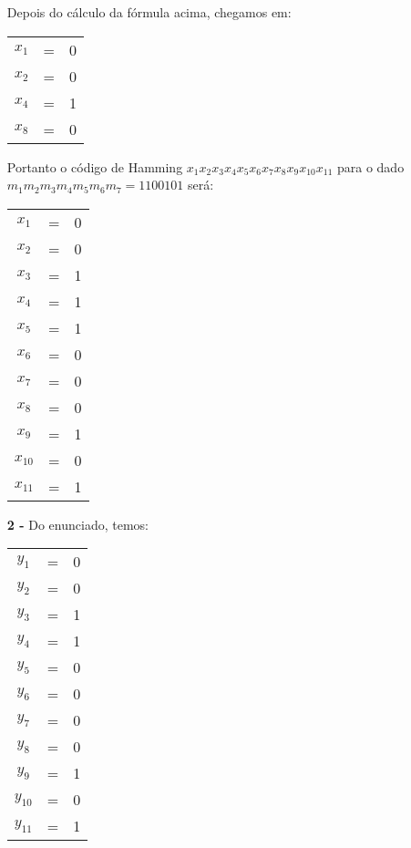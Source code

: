 \documentclass[12pt]{article}
\begin{document}
\begin{itemize}
			Depois do cálculo da fórmula acima, chegamos em:
			\begin{center}
				\begin{tabular}{ccl}
					$x_1$ & = & 0\\
					$x_2$ & = & 0\\
					$x_4$ & = & 1\\
					$x_8$ & = & 0\\
				\end{tabular}
			\end{center}
			Portanto o código de Hamming $x_1x_2x_3x_4x_5x_6x_7x_8x_9x_{10}x_{11}$ para 
			o dado $m_1m_2m_3m_4m_5m_6m_7 = 1100101$ será:
			\begin{center}
				\begin{tabular}{ccc}
					$x_1$ & = & 0\\
					$x_2$ & = & 0\\
					$x_3$ & = & 1 \\
					$x_4$ & = & 1\\
					$x_5$ & = & 1\\
					$x_6$ & = & 0\\
					$x_7$ & = & 0\\
					$x_8$ & = & 0\\
					$x_9$ & = & 1\\
					$x_{10}$ & = & 0\\
					$x_{11}$ & = & 1\\
				\end{tabular}
			\end{center}
		\newpage
		\item[\textbf{2 -}]
			\hfill\newline
			Do enunciado, temos:
			\begin{center}
				\begin{tabular}{ccc}
					$y_1$ & = & 0\\
					$y_2$ & = & 0\\
					$y_3$ & = & 1\\
					$y_4$ & = & 1\\
					$y_5$ & = & 0\\
					$y_6$ & = & 0\\
					$y_7$ & = & 0\\
					$y_8$ & = & 0\\
					$y_9$ & = & 1\\
					$y_{10}$ & = & 0\\
					$y_{11}$ & = & 1\\
				\end{tabular}
			\end{center}

\end{itemize}
\end{document}
